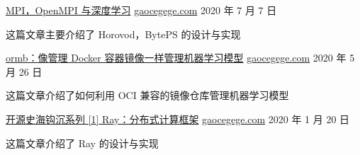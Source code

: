 

\begin{cventries}
  \cventry
    {}
    {\href{http://gaocegege.com/Blog/mpi-1}{MPI，OpenMPI 与深度学习}}
    {\href{http://gaocegege.com}{gaocegege.com}}
    {2020 年 7 月 7 日}
    {
      \begin{cvitems} %
        \item {
          这篇文章主要介绍了 Horovod，BytePS 的设计与实现
        }
      \end{cvitems}
    }

  \cventry
    {}
    {\href{http://gaocegege.com/Blog/ormb}{ormb：像管理 Docker 容器镜像一样管理机器学习模型}}
    {\href{http://gaocegege.com}{gaocegege.com}}
    {2020 年 5 月 26 日}
    {
      \begin{cvitems} %
        \item {
          这篇文章介绍了如何利用 OCI 兼容的镜像仓库管理机器学习模型
        }
      \end{cvitems}
    }

  \cventry
    {}
    {\href{http://gaocegege.com/Blog/why-do-i-like-ray}{开源史海钩沉系列 [1] Ray：分布式计算框架}}
    {\href{http://gaocegege.com}{gaocegege.com}}
    {2020 年 1 月 20 日}
    {
      \begin{cvitems} %
        \item {
          这篇文章介绍了 Ray 的设计与实现
        }
      \end{cvitems}
    }
\end{cventries}


